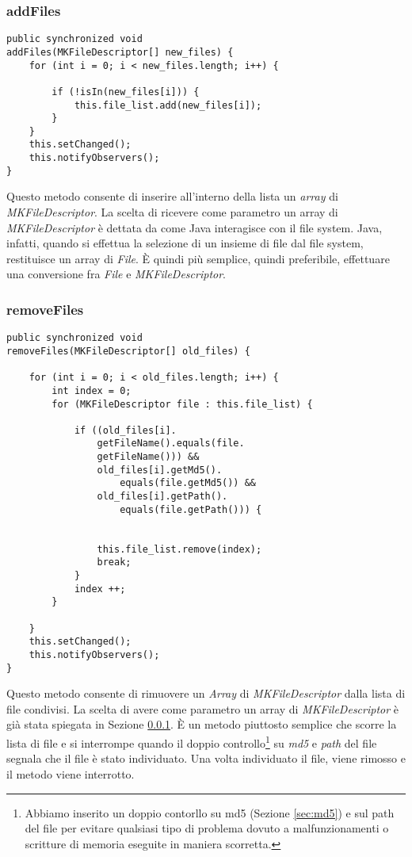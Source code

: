 \subsubsection{addFiles}\label{sec:on_files_add}
\begin{lstlisting}
public synchronized void 
addFiles(MKFileDescriptor[] new_files) {
	for (int i = 0; i < new_files.length; i++) {

		if (!isIn(new_files[i])) {
			this.file_list.add(new_files[i]);
		}
	}
	this.setChanged();
	this.notifyObservers();
}
\end{lstlisting}
Questo metodo consente di inserire all'interno della lista un \emph{array} di \emph{MKFileDescriptor}.
La scelta di ricevere come parametro un array di \emph{MKFileDescriptor} è dettata da come Java interagisce con il file system.
Java, infatti, quando si effettua la selezione di un insieme di file dal file system, restituisce un array di \emph{File}.
\`{E} quindi più semplice, quindi preferibile, effettuare una conversione fra \emph{File} e \emph{MKFileDescriptor}.

\subsubsection{removeFiles}
\begin{lstlisting}
public synchronized void 
removeFiles(MKFileDescriptor[] old_files) {
        
	for (int i = 0; i < old_files.length; i++) {
		int index = 0;
		for (MKFileDescriptor file : this.file_list) {
			
			if ((old_files[i].
				getFileName().equals(file.
				getFileName())) &&
				old_files[i].getMd5().
					equals(file.getMd5()) &&
				old_files[i].getPath().
					equals(file.getPath())) {

				
				this.file_list.remove(index);
				break;
			}
			index ++;
		}

	}
	this.setChanged();
	this.notifyObservers();
}
\end{lstlisting}
Questo metodo consente di rimuovere un \emph{Array} di \emph{MKFileDescriptor} dalla lista di file condivisi. La scelta di avere come parametro
un array di \emph{MKFileDescriptor} è già stata spiegata in Sezione \ref{sec:on_files_add}.
\`{E} un metodo piuttosto semplice che scorre la lista di file e si interrompe quando il doppio controllo\footnote{Abbiamo inserito un doppio contorllo su md5 (Sezione \ref{sec:md5}) e sul path del file per evitare qualsiasi tipo di problema dovuto a malfunzionamenti o scritture di memoria eseguite in maniera scorretta.} su \emph{md5} e \emph{path} del file segnala che il file è stato individuato.
Una volta individuato il file, viene rimosso e il metodo viene interrotto.

